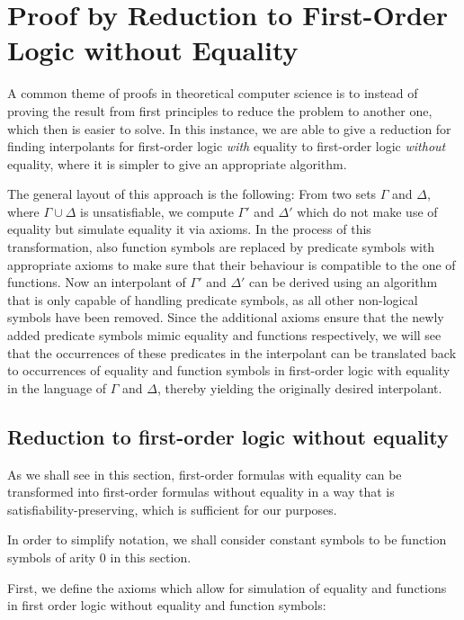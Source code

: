 \chapter{Proof by Reduction to First-Order Logic without Equality}

A common theme of proofs in theoretical computer science is to instead of proving the result from first principles to reduce the problem to another one, which then is easier to solve.
In this instance, we are able to give a reduction for finding interpolants for first-order logic \emph{with} equality to first-order logic \emph{without} equality, where it is simpler to give an appropriate algorithm.

The general layout of this approach is the following:
From two sets $\Gamma$ and $\Delta$, where $\Gamma \cup \Delta$ is unsatisfiable, we compute $\Gamma'$ and $\Delta'$ which do not make use of equality but simulate equality it via axioms.
In the process of this transformation, also function symbols are replaced by predicate symbols with appropriate axioms to make sure that their behaviour is compatible to the one of functions.
Now an interpolant of $\Gamma'$ and $\Delta'$ can be derived using an algorithm that is only capable of handling predicate symbols, as all other non-logical symbols have been removed.
Since the additional axioms ensure that the newly added predicate symbols mimic equality and functions respectively, we will see that the occurrences of these predicates in the interpolant can be translated back to occurrences of equality and function symbols in first-order logic with equality in the language of $\Gamma$ and $\Delta$, thereby yielding the originally desired interpolant.


\section{Reduction to first-order logic without equality}

As we shall see in this section, first-order formulas with equality can be transformed into first-order formulas without equality in a way that is satisfiability-preserving, which is sufficient for our purposes.

In order to simplify notation, we shall consider constant symbols to be function symbols of arity $0$ in this section.

First, we define the axioms which allow for simulation of equality and functions in first order logic without equality and function symbols:

